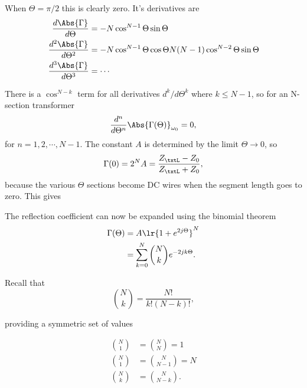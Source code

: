 When \( \Theta = \pi/2 \) this is clearly zero.  It's derivatives are
\begin{equation}\label{eqn:uwavesDeck7MultisectionTransformersCore:180}
\begin{aligned}
\frac{d \Abs{\Gamma}}{d\Theta} &= -N \cos^{N-1} \Theta \sin\Theta \\
\frac{d^2 \Abs{\Gamma}}{d\Theta^2} &= -N \cos^{N-1} \Theta \cos\Theta N(N-1) \cos^{N-2} \Theta \sin\Theta  \\
\frac{d^3 \Abs{\Gamma}}{d\Theta^3} &= \cdots
\end{aligned}
\end{equation}

There is a \( \cos^{N-k} \) term for all derivatives \( d^k/d\Theta^k \) where \( k \le N-1 \), so for an N-section transformer
\begin{equation}\label{eqn:uwavesDeck7MultisectionTransformersCore:140}
\frac{d^n}{d\Theta^n} \Abs{\Gamma(\Theta)}_{\omega_0} = 0,
\end{equation}
for \( n = 1, 2, \cdots, N-1 \).  The constant \( A \) is determined by the limit \( \Theta \rightarrow 0 \), so
\begin{equation}\label{eqn:uwavesDeck7MultisectionTransformersCore:200}
\Gamma(0) = 2^N A = \frac{Z_\txtL - Z_0}{Z_\txtL + Z_0},
\end{equation}
because the various \( \Theta \) sections become DC wires when the segment length goes to zero.  This gives

The reflection coefficient can now be expanded using the binomial theorem
\begin{equation}\label{eqn:uwavesDeck7MultisectionTransformersCore:240}
\begin{aligned}
\Gamma(\Theta)
&= A \lr{ 1 + e^{ 2 j \Theta } }^N
\\ &= \sum_{k = 0}^N \binom{N}{k} e^{ -2 j k \Theta}.
\end{aligned}
\end{equation}

Recall that
\begin{equation}\label{eqn:uwavesDeck7MultisectionTransformersCore:260}
\binom{N}{k} = \frac{N!}{k! (N-k)!},
\end{equation}

providing a symmetric set of values

\begin{equation}\label{eqn:uwavesDeck7MultisectionTransformersCore:280}
\begin{aligned}
\binom{N}{1} &= \binom{N}{N} = 1 \\
\binom{N}{1} &= \binom{N}{N-1} = N \\
\binom{N}{k} &= \binom{N}{N-k}.
\end{aligned}
\end{equation}

